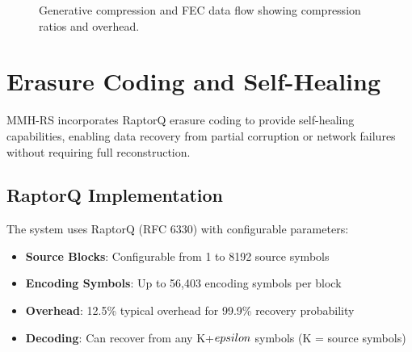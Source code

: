 \documentclass[11pt,a4paper]{article}
\begin{document}
	\begin{figure}[htbp]
	\centering
	\caption{Generative compression and FEC data flow showing compression ratios and overhead.}
	\label{fig:generative-fec-flow}
	\end{figure}
	
	\section{Erasure Coding and Self-Healing}
	\label{sec:fec}
	
	MMH-RS incorporates RaptorQ erasure coding to provide self-healing capabilities, enabling data recovery from partial corruption or network failures without requiring full reconstruction.
	
	\subsection{RaptorQ Implementation}
	
	The system uses RaptorQ (RFC 6330) with configurable parameters:
	\begin{itemize}
		\item \textbf{Source Blocks}: Configurable from 1 to 8192 source symbols
		\item \textbf{Encoding Symbols}: Up to 56,403 encoding symbols per block
		\item \textbf{Overhead}: 12.5\% typical overhead for 99.9\% recovery probability
		\item \textbf{Decoding}: Can recover from any K+$\\epsilon$ symbols (K = source symbols)
	\end{itemize}
	
\end{document}
